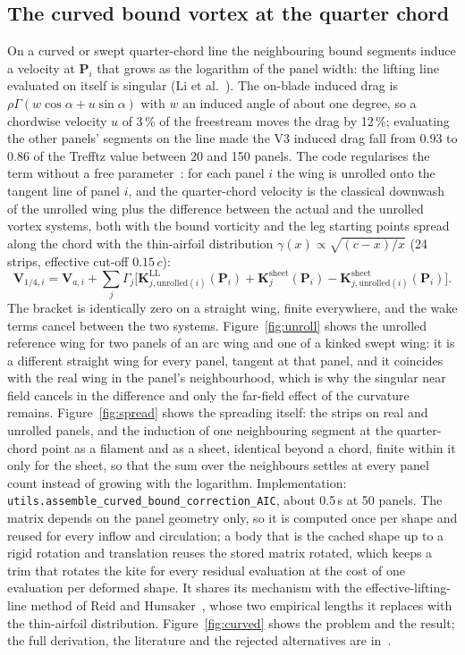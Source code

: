 \documentclass[11pt,a4paper]{article}
\newcommand{\vect}[1]{\mathbf{#1}}
\newcommand{\code}[1]{\texttt{#1}}
\begin{document}
\subsection{The curved bound vortex at the quarter chord}
\label{sec:curved}
On a curved or swept quarter-chord line the neighbouring bound segments induce a velocity at $\vect P_i$ that grows as the logarithm of the panel width: the lifting line evaluated on itself is singular (Li et al.~\cite{li2020}). The on-blade induced drag is $\rho\Gamma(w\cos\alpha+u\sin\alpha)$ with $w$ an induced angle of about one degree, so a chordwise velocity $u$ of 3\,\% of the freestream moves the drag by 12\,\%; evaluating the other panels' segments on the line made the V3 induced drag fall from 0.93 to 0.86 of the Trefftz value between 20 and 150 panels. The code regularises the term without a free parameter~\cite{report}: for each panel $i$ the wing is unrolled onto the tangent line of panel $i$, and the quarter-chord velocity is the classical downwash of the unrolled wing plus the difference between the actual and the unrolled vortex systems, both with the bound vorticity and the leg starting points spread along the chord with the thin-airfoil distribution $\gamma(x)\propto\sqrt{(c-x)/x}$ (24 strips, effective cut-off $0.15\,c$):
\begin{equation}
\vect V_{1/4,i}=\vect V_{a,i}+\sum_j\Gamma_j\Big[\vect K^{\mathrm{LL}}_{j,\mathrm{unrolled}(i)}(\vect P_i)+\vect K^{\mathrm{sheet}}_{j}(\vect P_i)-\vect K^{\mathrm{sheet}}_{j,\mathrm{unrolled}(i)}(\vect P_i)\Big].
\label{eq:curved}
\end{equation}
The bracket is identically zero on a straight wing, finite everywhere, and the wake terms cancel between the two systems. Figure~\ref{fig:unroll} shows the unrolled reference wing for two panels of an arc wing and one of a kinked swept wing: it is a different straight wing for every panel, tangent at that panel, and it coincides with the real wing in the panel's neighbourhood, which is why the singular near field cancels in the difference and only the far-field effect of the curvature remains. Figure~\ref{fig:spread} shows the spreading itself: the strips on real and unrolled panels, and the induction of one neighbouring segment at the quarter-chord point as a filament and as a sheet, identical beyond a chord, finite within it only for the sheet, so that the sum over the neighbours settles at every panel count instead of growing with the logarithm. Implementation: \code{utils.assemble\_curved\_bound\_correction\_AIC}, about 0.5\,s at 50 panels. The matrix depends on the panel geometry only, so it is computed once per shape and reused for every inflow and circulation; a body that is the cached shape up to a rigid rotation and translation reuses the stored matrix rotated, which keeps a trim that rotates the kite for every residual evaluation at the cost of one evaluation per deformed shape. It shares its mechanism with the effective-lifting-line method of Reid and Hunsaker~\cite{reid2020}, whose two empirical lengths it replaces with the thin-airfoil distribution. Figure~\ref{fig:curved} shows the problem and the result; the full derivation, the literature and the rejected alternatives are in~\cite{report}.
\end{document}
